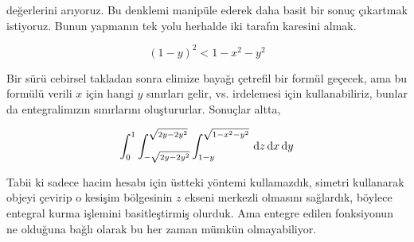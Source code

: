 \documentclass[12pt,fleqn]{article}\usepackage{../../common}
\begin{document}
değerlerini arıyoruz. Bu denklemi manipüle ederek daha basit bir sonuç
çıkartmak istiyoruz. Bunun yapmanın tek yolu herhalde iki tarafın karesini
almak. 

$$ (1-y)^2 < 1-x^2-y^2 $$

Bir sürü cebirsel takladan sonra elimize bayağı çetrefil bir formül
geçecek, ama bu formülü verili $x$ için hangi $y$ sınırları gelir,
vs. irdelemesi için kullanabiliriz, bunlar da entegralimızın sınırlarını
oluştururlar. Sonuçlar altta,

$$ 
\int _{0}^{1} 
\int _{-\sqrt{2y-2y^2}}^{\sqrt{2y-2y^2}} 
\int _{1-y}^{\sqrt{1-x^2-y^2}}
\,\mathrm{d} z \,\mathrm{d} x \,\mathrm{d} y
$$

Tabii ki sadece hacim hesabı için üstteki yöntemi kullamazdık, simetri
kullanarak objeyi çevirip o kesişim bölgesinin $z$ ekseni merkezli olmasını
sağlardık, böylece entegral kurma işlemini basitleştirmiş olurduk. Ama
entegre edilen fonksiyonun ne olduğuna bağlı olarak bu her zaman mümkün
olmayabiliyor. 
\end{document}
